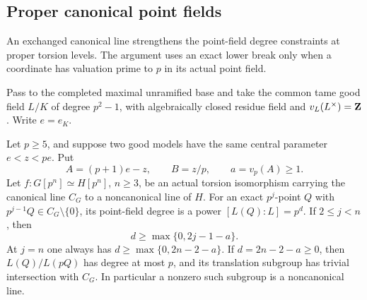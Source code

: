 \subsection{Proper canonical point fields}
\label{sec:proper-canonical-point-fields}
An exchanged canonical line strengthens the point-field degree
constraints at proper torsion levels. The argument uses an exact lower
break only when a coordinate has valuation prime to $p$ in its
actual point field.

Pass to the completed maximal unramified base and take the common
tame good field $L/K$ of degree $p^2-1$, with algebraically closed
residue field and $v_L(L^\times)=\mathbf Z$. Write $e=e_K$.

\begin{proposition}\label{prop:proper-canonical-point-fields}
Let $p\ge5$, and suppose two good models have the same central
parameter $e<z<pe$. Put
\[
 A=(p+1)e-z,\qquad B=z/p,\qquad a=v_p(A)\ge1.
\]
Let $f:G[p^n]\simeq H[p^n]$, $n\ge3$, be an actual torsion
isomorphism carrying the canonical line $C_G$ to a noncanonical
line of $H$. For an exact $p^j$-point $Q$ with
$p^{j-1}Q\in C_G\setminus\{0\}$, its point-field degree is a
power $[L(Q):L]=p^d$. If $2\le j<n$, then
\[
 d\ge\max\{0,2j-1-a\}.
\]
At $j=n$ one always has $d\ge\max\{0,2n-2-a\}$.
If $d=2n-2-a\ge0$, then $L(Q)/L(pQ)$ has degree at most $p$,
and its translation subgroup has trivial intersection with $C_G$.
In particular a nonzero such subgroup is a noncanonical line.
\end{proposition}

